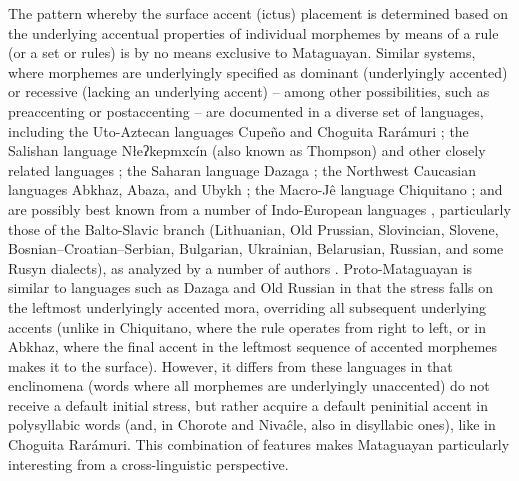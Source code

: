The pattern whereby the surface accent (ictus) placement is determined based on the underlying accentual properties of individual morphemes by means of a rule (or a set or rules) is by no means exclusive to Mataguayan. Similar systems, where morphemes are underlyingly specified as dominant (underlyingly accented) or recessive (lacking an underlying accent) – among other possibilities, such as preaccenting or postaccenting – are documented in a diverse set of languages, including the Uto-Aztecan languages Cupeño \citep{JHH-KH-68,JDA99} and Choguita Rarámuri \citep{GC11,GC-LC-15}; the Salishan language Nłeʔkepmxcín (also known as Thompson) and other closely related languages \citep{LCT-MTT-92,GC02}; the Saharan language Dazaga \citep{VD95}; the Northwest Caucasian languages Abkhaz, Abaza, and Ubykh \citep{AS85,VD00,LB21}; the Macro-Jê language Chiquitano \citep{AN22}; and are possibly best known from a number of Indo-European languages \citep{PK-MH-77}, particularly those of the Balto-Slavic branch (Lithuanian, Old Prussian, Slovincian, Slovene, Bosnian–Croatian–Serbian, Bulgarian, Ukrainian, Belarusian, Russian, and some Rusyn dialects), as analyzed by a number of authors \citep{AZ85,JLM89,VD00,YK19}. Proto-Mataguayan is similar to languages such as Dazaga and Old Russian in that the stress falls on the leftmost underlyingly accented mora, overriding all subsequent underlying accents (unlike in Chiquitano, where the rule operates from right to left, or in Abkhaz, where the final accent in the leftmost sequence of accented morphemes makes it to the surface). However, it differs from these languages in that enclinomena (words where all morphemes are underlyingly unaccented) do not receive a default initial stress, but rather acquire a default peninitial accent in polysyllabic words (and, in Chorote and Nivaĉle, also in disyllabic ones), like in Choguita Rarámuri. This combination of features makes Mataguayan particularly interesting from a cross-linguistic perspective.
